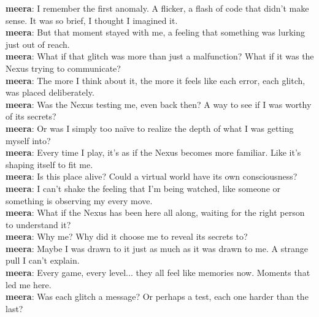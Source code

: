 \documentclass[12pt]{book}
\begin{document}
\textbf{meera}: I remember the first anomaly. A flicker, a flash of code that didn't make sense. It was so brief, I thought I imagined it.\\

\textbf{meera}: But that moment stayed with me, a feeling that something was lurking just out of reach.\\

\textbf{meera}: What if that glitch was more than just a malfunction? What if it was the Nexus trying to communicate?\\

\textbf{meera}: The more I think about it, the more it feels like each error, each glitch, was placed deliberately.\\

\textbf{meera}: Was the Nexus testing me, even back then? A way to see if I was worthy of its secrets?\\

\textbf{meera}: Or was I simply too naïve to realize the depth of what I was getting myself into?\\

\textbf{meera}: Every time I play, it's as if the Nexus becomes more familiar. Like it's shaping itself to fit me.\\

\textbf{meera}: Is this place alive? Could a virtual world have its own consciousness?\\

\textbf{meera}: I can't shake the feeling that I'm being watched, like someone or something is observing my every move.\\

\textbf{meera}: What if the Nexus has been here all along, waiting for the right person to understand it?\\

\textbf{meera}: Why me? Why did it choose me to reveal its secrets to?\\

\textbf{meera}: Maybe I was drawn to it just as much as it was drawn to me. A strange pull I can't explain.\\

\textbf{meera}: Every game, every level... they all feel like memories now. Moments that led me here.\\

\textbf{meera}: Was each glitch a message? Or perhaps a test, each one harder than the last?\\
\end{document}

